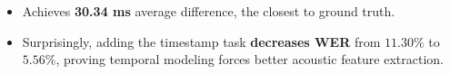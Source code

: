\documentclass[25pt, a0paper, landscape]{tikzposter}
\newcommand{\techicon}{%
\raisebox{-0.1em}{\shortstack[c]{%
\textcolor{red!75!black}{\normalsize$\bullet$}\\[-0.1ex]
\textcolor{orange!80!black}{\normalsize$\bullet$}\\[-0.1ex]
\textcolor{green!60!black}{\normalsize$\bullet$}}}%
\hspace{0.28em}%
}
\begin{document}
\begin{columns}
{            \vspace{0.5cm}
            \begin{itemize}
                \item Achieves \textbf{30.34 ms} average difference, the closest to ground truth.
                \item Surprisingly, adding the timestamp task \textbf{decreases WER} from $11.30\%$ to $5.56\%$, proving temporal modeling forces better acoustic feature extraction.
            \end{itemize}
        }
        
            
            

\end{columns}
\end{document}
